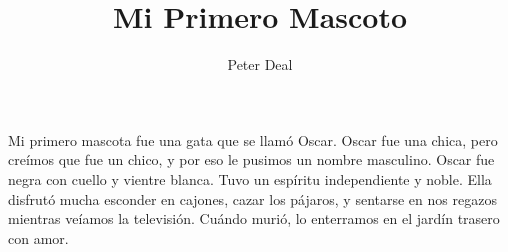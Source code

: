\documentclass{slides}
\title{Mi Primero Mascoto}
\author{Peter Deal}
\begin{document}
Mi primero mascota fue una gata que se llamó Oscar. Oscar fue una chica, pero creímos que fue un chico, y por eso le pusimos un nombre masculino. Oscar fue negra con cuello y vientre blanca. Tuvo un espíritu independiente y noble. Ella disfrutó mucha esconder en cajones, cazar los pájaros, y sentarse en nos regazos mientras veíamos la televisión. Cuándo murió, lo enterramos en el jardín trasero con amor.
\end{document}
